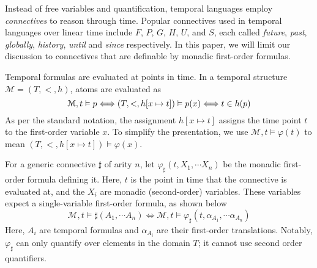 \documentclass[a4paper,UKenglish,cleveref, autoref, thm-restate, numberwithinsect]{lipics-v2021}
\begin{document}
Instead of free variables and quantification, temporal languages employ \textit{connectives} to reason through time. Popular connectives used in temporal languages over linear time include $F$, $P$, $G$, $H$, $U$, and $S$, each called \textit{future}, \textit{past}, \textit{globally}, \textit{history}, \textit{until} and \textit{since} respectively. In this paper, we will limit our discussion to connectives that are definable by monadic first-order formulas.

Temporal formulas are evaluated at points in time. In a temporal structure $\mathcal{M} = (T, <, h)$, atoms are evaluated as
\begin{equation*}
    \mathcal{M}, t \vDash p \Longleftrightarrow (T, <, h[x \mapsto t]) \vDash p(x) \Longleftrightarrow t \in h(p)\\
\end{equation*}
As per the standard notation, the assignment $h[x \mapsto t]$ assigns the time point $t$ to the first-order variable $x$. To simplify the presentation, we use $\mathcal{M}, t \vDash \varphi(t)$ to mean $(T, <, h[x \mapsto t]) \vDash \varphi(x)$.

For a generic connective $\sharp$ of arity $n$, let $\varphi_\sharp(t, X_1, \cdots X_n)$ be the monadic first-order formula defining it. Here, $t$ is the point in time that the connective is evaluated at, and the $X_i$ are monadic (second-order) variables. These variables expect a single-variable first-order formula, as shown below
\begin{equation*}
    \mathcal{M}, t \vDash \sharp(A_1, \cdots A_n) \Longleftrightarrow \mathcal{M}, t \vDash \varphi_\sharp(t, \alpha_{A_1}, \cdots \alpha_{A_n})
\end{equation*}
Here, $A_i$ are temporal formulas and $\alpha_{A_i}$ are their first-order translations. Notably, $\varphi_\sharp$ can only quantify over elements in the domain $T$; it cannot use second order quantifiers.
\end{document}
